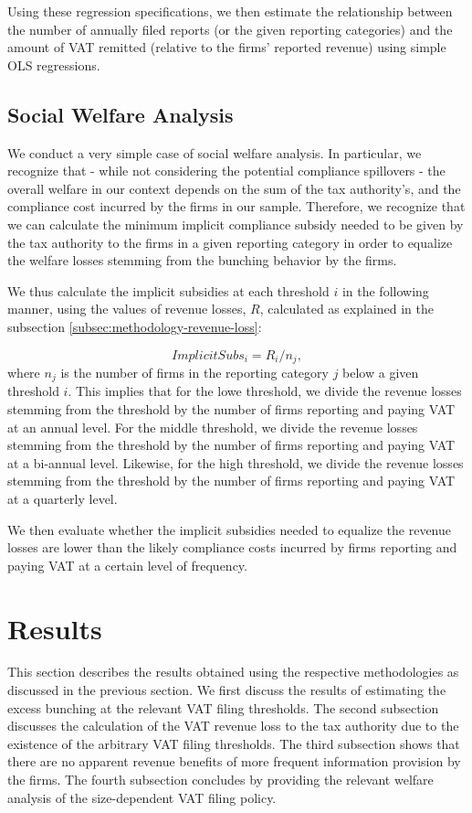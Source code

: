 Using these regression specifications, we then estimate the relationship
between the number of annually filed reports (or the given reporting
categories) and the amount of VAT remitted (relative to the firms'
reported revenue) using simple OLS regressions.

\subsection{Social Welfare Analysis}
\label{subsec:methodology-welfare-analysis}
We conduct a very simple case of social welfare analysis. In particular, we recognize that - while not considering the potential compliance spillovers - the overall welfare in our context depends on the sum of the tax authority's, and the compliance cost incurred by the firms in our sample. Therefore, we recognize that we can calculate the minimum implicit compliance subsidy needed to be given by the tax authority to the firms in a given reporting category in order to equalize the welfare losses stemming from the bunching behavior by the firms.

We thus calculate the implicit subsidies at each threshold $i$ in the following manner, using the values of revenue losses, $R$, calculated as explained in the subsection \ref{subsec:methodology-revenue-loss}:

\begin{equation}
ImplicitSubs_i = R_i / n_j,
\end{equation}
where $n_j$ is the number of firms in the reporting category $j$ below a given threshold $i$. This implies that for the lowe threshold, we divide the revenue losses stemming from the threshold by the number of firms reporting and paying VAT at an annual level. For the middle threshold, we divide the revenue losses stemming from the threshold by the number of firms reporting and paying VAT at a bi-annual level. Likewise, for the high threshold, we divide the revenue losses stemming from the threshold by the number of firms reporting and paying VAT at a quarterly level. 

We then evaluate whether the implicit subsidies needed to equalize the revenue losses are lower than the likely compliance costs incurred by firms reporting and paying VAT at a certain level of frequency.

\section{Results}
\label{sec:results}
This section describes the results obtained using the respective methodologies
as discussed in the previous section. We first discuss the results
of estimating the excess bunching at the relevant VAT filing thresholds.
The second subsection discusses the calculation of the VAT revenue
loss to the tax authority due to the existence of the arbitrary VAT
filing thresholds. The third subsection shows that there are no apparent
revenue benefits of more frequent information provision by the firms.
The fourth subsection concludes by providing the relevant welfare
analysis of the size-dependent VAT filing policy.

